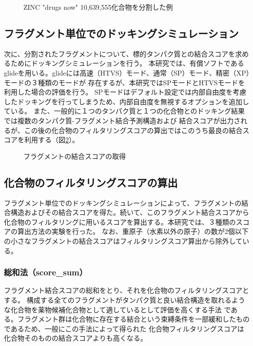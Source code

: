 \begin{figure}[htp]
 \begin{center}
  \caption{ZINC "drugs now" 10,639,555化合物を分割した例}
  \label{fig:decomposition_amount}
 \end{center}
\end{figure}

\subsection{フラグメント単位でのドッキングシミュレーション}
次に、分割されたフラグメントについて、標的タンパク質との結合スコアを求めるためにドッキングシミュレーションを行う。
本研究では、有償ソフトであるglide\citetodo{}を用いる。glideには高速（HTVS）モード、通常（SP）モード、精密（XP）モードの３種類のモードが
存在するが、本研究ではSPモードとHTVSモードを利用した場合の評価を行う。
SPモードはデフォルト設定では内部自由度を考慮したドッキングを行ってしまうため、内部自由度を無視するオプションを追加している。
また、一般的に１つのタンパク質と１つの化合物とのドッキング結果では複数のタンパク質-フラグメント結合予測構造および
結合スコアが出力されるが、この後の化合物のフィルタリングスコアの算出ではこのうち最良の結合スコアを利用する（図\ref{fig:fragment_result}）。

\begin{figure}[htp]
 \begin{center}
  \caption{フラグメントの結合スコアの取得}
  \label{fig:fragment_result}
 \end{center}
\end{figure}

\subsection{化合物のフィルタリングスコアの算出}
フラグメント単位でのドッキングシミュレーションによって、フラグメントの結合構造およびその結合スコアを得た。続いて、このフラグメント結合スコアから
化合物のフィルタリングに用いるスコアを算出する。本研究では、３種類のスコアの算出方法の実験を行った。
なお、重原子（水素以外の原子）の数が2個以下の小さなフラグメントの結合スコアはフィルタリングスコア算出から除外している。

\subsubsection{総和法（score\_sum）}
フラグメント結合スコアの総和をとり、それを化合物のフィルタリングスコアとする。
構成する全てのフラグメントがタンパク質と良い結合構造を取れるような化合物を薬物候補化合物として適しているとして評価を高くする手法
である。フラグメント群は化合物に存在する結合という束縛条件を一部緩和したものであるため、一般にこの手法によって得られた
化合物フィルタリングスコアは化合物そのものの結合スコアよりも高くなる。

